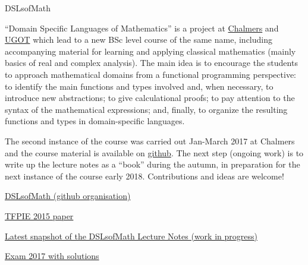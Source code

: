\begin{hcarentry}[updated]{DSLsofMath}
\makeheader

``Domain Specific Languages of Mathematics'' is a project at
\href{http://www.chalmers.se/en/Pages/default.aspx}{Chalmers} and
\href{http://www.gu.se/english}{UGOT} which lead to a new BSc level course of
the same name, including accompanying material for learning and applying
classical mathematics (mainly basics of real and complex analysis).
%
The main idea is to encourage the students to approach mathematical domains
from a functional programming perspective:
%
to identify the main functions and types involved and, when necessary, to
introduce new abstractions;
%
to give calculational proofs;
%
to pay attention to the syntax of the mathematical expressions;
%
and, finally, to organize the resulting functions and types in domain-specific
languages.

The second instance of the course was carried out Jan-March 2017 at Chalmers
and the course material is available on
\href{https://github.com/DSLsofMath/DSLsofMath}{github}.
%
The next step (ongoing work) is to write up the lecture notes as a ``book''
during the autumn, in preparation for the next instance of the course early
2018.
%
Contributions and ideas are welcome!

\FurtherReading
\begin{compactitem}
\item \href{https://github.com/DSLsofMath}{DSLsofMath (github organisation)}
\item \href{https://github.com/DSLsofMath/tfpie2015}{TFPIE 2015 paper}
\item \href{https://github.com/DSLsofMath/DSLsofMath/tree/master/L/snapshots}{Latest snapshot of the DSLsofMath Lecture Notes (work in progress)}
\item \href{https://github.com/DSLsofMath/DSLsofMath/blob/master/Exam/2017-03/}{Exam 2017 with solutions}
\end{compactitem}
\end{hcarentry}
